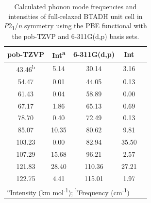 \begin{table}[ht]
    \centering
    \caption{Calculated phonon mode frequencies and intensities of full-relaxed BTADH unit cell in \textit{P}2\textsubscript{1}/\textit{n} symmetry using the PBE functional with the pob-TZVP and 6-311G(d,p) basis sets. }
    \begin{tabular}{c|c|c|c|c}
    \textbf{pob-TZVP} & \textbf{Int\textsuperscript{a}} & \textbf{6-311G(d,p)} & \textbf{Int} \\
    \hline
    43.46\textsuperscript{b} & 5.14 & 30.14 & 3.16 \\
    54.47 & 0.01 & 44.05 & 0.13 \\
    61.43 & 0.04 & 58.89 & 0.00 \\
    67.17 & 1.86 & 65.13 & 0.69 \\
    78.70 & 0.40 & 72.49 & 0.13 \\
    85.07 & 10.35 & 80.62 & 9.81 \\
    103.23 & 0.00 & 82.94 & 35.50 \\
    107.29 & 15.68 & 96.21 & 2.57 \\
    121.83 & 28.40 & 110.36 & 27.21 \\
    122.75 & 4.41 & 115.01 & 1.97 \\
    \hline
    \multicolumn{4}{l}{\textsuperscript{a}Intensity (km mol\textsuperscript{-1}); \textsuperscript{b}Frequency (cm\textsuperscript{-1})} \\

    \end{tabular}
    \label{intensities}
\end{table}
\newpage

